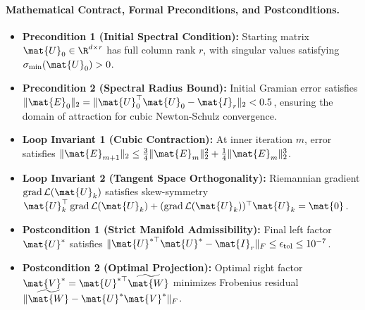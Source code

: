 \paragraph{Mathematical Contract, Formal Preconditions, and Postconditions.}
\begin{itemize}
    \item \textbf{Precondition 1 (Initial Spectral Condition):} Starting matrix $\mat{U}_0 \in \R^{d \times r}$ has full column rank $r$, with singular values satisfying $\sigma_{\min}(\mat{U}_0) > 0$.
    \item \textbf{Precondition 2 (Spectral Radius Bound):} Initial Gramian error satisfies $\|\mat{E}_0\|_2 = \|\mat{U}_0^\top \mat{U}_0 - \mat{I}_r\|_2 < 0.5$, ensuring the domain of attraction for cubic Newton-Schulz convergence.
    \item \textbf{Loop Invariant 1 (Cubic Contraction):} At inner iteration $m$, error satisfies $\|\mat{E}_{m+1}\|_2 \le \frac{3}{4}\|\mat{E}_m\|_2^2 + \frac{1}{4}\|\mat{E}_m\|_2^3$.
    \item \textbf{Loop Invariant 2 (Tangent Space Orthogonality):} Riemannian gradient $\operatorname{grad}\mathcal{L}(\mat{U}_k)$ satisfies skew-symmetry $\mat{U}_k^\top \operatorname{grad}\mathcal{L}(\mat{U}_k) + (\operatorname{grad}\mathcal{L}(\mat{U}_k))^\top \mat{U}_k = \mat{0}$.
    \item \textbf{Postcondition 1 (Strict Manifold Admissibility):} Final left factor $\mat{U}^*$ satisfies $\|\mat{U}^{*\top} \mat{U}^* - \mat{I}_r\|_F \le \epsilon_{\text{tol}} \le 10^{-7}$.
    \item \textbf{Postcondition 2 (Optimal Projection):} Optimal right factor $\mat{V}^* = \mat{U}^{*\top} \widetilde{\mat{W}}$ minimizes Frobenius residual $\|\widetilde{\mat{W}} - \mat{U}^*\mat{V}^*\|_F$.
\end{itemize}

